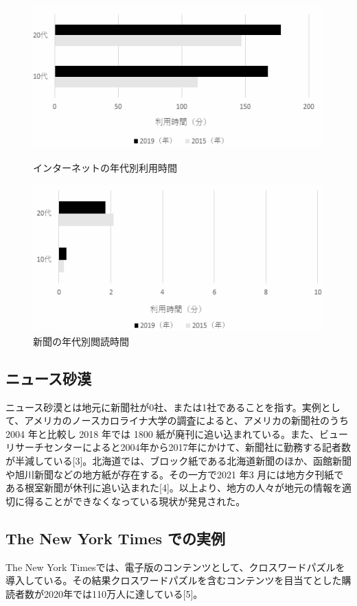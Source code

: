 \begin{figure}[htbp]
    \begin{minipage}[b]{0.45\linewidth}
        \centering
        \includegraphics[keepaspectratio, scale=0.35]{images/newspaper2.png}
        \caption{インターネットの年代別利用時間}
    \end{minipage}
    \begin{minipage}[b]{0.45\linewidth}
        \centering
        \includegraphics[keepaspectratio, scale=0.35]{images/newspaper3.png}
        \caption{新聞の年代別閲読時間 }
    \end{minipage}
\end{figure}

\subsection{ニュース砂漠}
ニュース砂漠とは地元に新聞社が0社、または1社であることを指す。実例として、アメリカのノースカロライナ大学の調査によると、アメリカの新聞社のうち 2004 年と比較し 2018 年では 1800 紙が廃刊に追い込まれている。また、ビューリサーチセンターによると2004年から2017年にかけて、新聞社に勤務する記者数が半減している[3]。北海道では、ブロック紙である北海道新聞のほか、函館新聞や旭川新聞などの地方紙が存在する。その一方で2021 年3 月には地方夕刊紙である根室新聞が休刊に追い込まれた[4]。以上より、地方の人々が地元の情報を適切に得ることができなくなっている現状が発見された。

\subsection{The New York Times での実例}
The New York Timesでは、電子版のコンテンツとして、クロスワードパズルを導入している。その結果クロスワードパズルを含むコンテンツを目当てとした購読者数が2020年では110万人に達している[5]。
